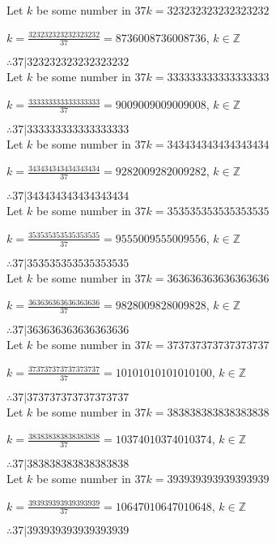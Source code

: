 \documentclass{article}
\begin{document}
Let $k$ be some number in $37k = 323232323232323232$

$k = \frac{323232323232323232}{37} = 8736008736008736$, $k \in \mathbb{Z}$

$ \therefore  37|323232323232323232 $ \\

Let $k$ be some number in $37k = 333333333333333333$

$k = \frac{333333333333333333}{37} = 9009009009009008$, $k \in \mathbb{Z}$

$ \therefore  37|333333333333333333 $ \\

Let $k$ be some number in $37k = 343434343434343434$

$k = \frac{343434343434343434}{37} = 9282009282009282$, $k \in \mathbb{Z}$

$ \therefore  37|343434343434343434 $ \\

Let $k$ be some number in $37k = 353535353535353535$

$k = \frac{353535353535353535}{37} = 9555009555009556$, $k \in \mathbb{Z}$

$ \therefore  37|353535353535353535 $ \\

Let $k$ be some number in $37k = 363636363636363636$

$k = \frac{363636363636363636}{37} = 9828009828009828$, $k \in \mathbb{Z}$

$ \therefore  37|363636363636363636 $ \\

Let $k$ be some number in $37k = 373737373737373737$

$k = \frac{373737373737373737}{37} = 10101010101010100$, $k \in \mathbb{Z}$

$ \therefore  37|373737373737373737 $ \\

Let $k$ be some number in $37k = 383838383838383838$

$k = \frac{383838383838383838}{37} = 10374010374010374$, $k \in \mathbb{Z}$

$ \therefore  37|383838383838383838 $ \\

Let $k$ be some number in $37k = 393939393939393939$

$k = \frac{393939393939393939}{37} = 10647010647010648$, $k \in \mathbb{Z}$

$ \therefore  37|393939393939393939 $ \\
\end{document}

